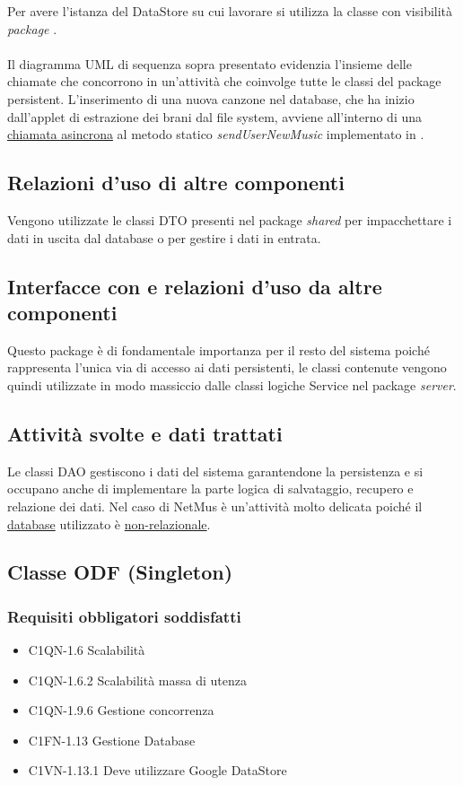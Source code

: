 Per avere l'istanza del DataStore su cui lavorare si
utilizza la classe con visibilit\`a \emph{package} . \\\\
Il diagramma UML di sequenza sopra presentato evidenzia l'insieme delle chiamate
che concorrono in un'attivit\`a che coinvolge tutte le classi del package
persistent. L'inserimento di una nuova canzone nel database, che ha inizio
dall'applet di estrazione dei brani dal file system, avviene all'interno di una
\underline{chiamata asincrona} al metodo statico \emph{sendUserNewMusic}
implementato in .
\subsection*{Relazioni d'uso di altre componenti} Vengono utilizzate le classi
DTO presenti nel package \emph{shared} per impacchettare i dati in uscita dal
database o per gestire i dati in entrata. 
\subsection*{Interfacce con e relazioni d'uso da altre
componenti} Questo package \`e di fondamentale importanza per il resto del sistema poich\'e rappresenta l'unica via di accesso ai dati persistenti, le classi contenute vengono quindi utilizzate in modo massiccio dalle classi logiche Service nel package \emph{server}.
\subsection*{Attivit\`a svolte e dati trattati}
Le classi DAO gestiscono i dati del sistema garantendone la persistenza e si
occupano anche di implementare la parte logica di salvataggio, recupero e
relazione dei dati. Nel caso di NetMus \`e un'attivit\`a molto delicata poich\'e il
\underline{database} utilizzato \`e \underline{non-relazionale}.

\subsection{Classe ODF (Singleton)}
\subsubsection*{Requisiti obbligatori soddisfatti}
\begin{itemize}
    \item C1QN-1.6 Scalabilit\`a
    \item C1QN-1.6.2 Scalabilit\`a massa di utenza
    \item C1QN-1.9.6 Gestione concorrenza
    \item C1FN-1.13 Gestione Database
    \item C1VN-1.13.1 Deve utilizzare Google DataStore
\end{itemize}
